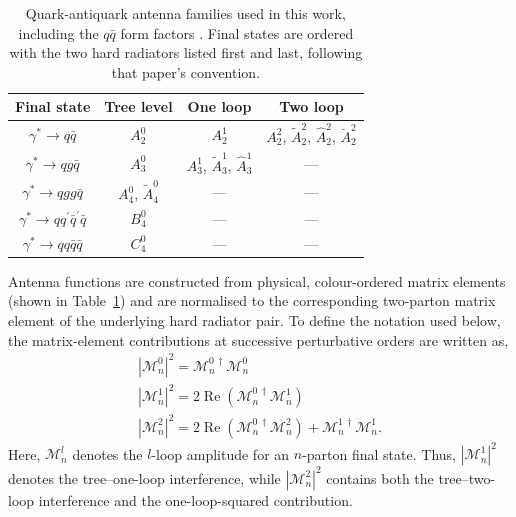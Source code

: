 \begin{table}[h]
\footnotesize
    \centering
\caption{\centering Quark-antiquark antenna families used in this work, including 
    the $q\bar q$ form factors \cite{Gehrmann-DeRidder:2005btv}. Final states are 
    ordered with the two hard radiators listed first and last, following that paper's convention.}
    \renewcommand{\arraystretch}{1.3}
    \begin{tabular}{|c|c|c|c|}
        \hline
        \textbf{Final state} & \textbf{Tree level} & \textbf{One loop} & \textbf{Two loop} \\
        \hline
        $\gamma^*\to q\bar q$ & $A_2^0$ & $A_2^1$ & $A_2^2$, $\tilde A_2^2$, $\hat A_2^2$, $\breve A_2^2$ \\
        \hline
        $\gamma^*\to qg\bar q$ & $A_3^0$ & $A_3^1$, $\tilde A_3^1$, $\hat A_3^1$ & --- \\
     \hline
        $\gamma^*\to qgg\bar q$ & $A_4^0$, $\tilde A_4^0$ & --- & --- \\
        \hline
        $\gamma^*\to qq^\prime\bar q^\prime\bar q$ & $B_4^0$ & --- & --- \\
        \hline
        $\gamma^*\to qq\bar q\bar q$ & $C_4^0$ & --- & --- \\
        \hline
    \end{tabular}
    
    \label{tab:antFamilies}
\end{table}

Antenna functions are constructed from physical, colour-ordered matrix elements
(shown in Table~\ref{tab:antFamilies}) and are normalised to the corresponding
two-parton matrix element of the underlying hard radiator pair. To define the
notation used below, the matrix-element contributions at successive
perturbative orders are written as,
\begin{equation}\label{eq:ampOrders}
    \begin{gathered}
        |\mathcal M_n^0|^2 = \mathcal M_n^{0\,\dagger}\mathcal M_n^0\\
        |\mathcal M_n^1|^2 = 2\operatorname{Re}\left(\mathcal M_n^{0\,\dagger}\mathcal M_n^1\right)\\
        |\mathcal M_n^2|^2 = 2\operatorname{Re}\left(\mathcal M_n^{0\,\dagger}\mathcal M_n^2\right)+\mathcal M_n^{1\,\dagger}\mathcal M_n^{1}.
    \end{gathered}
\end{equation}
Here, $\mathcal M_n^l$ denotes the $l$-loop amplitude for an $n$-parton final
state. Thus, $|\mathcal M_n^1|^2$ denotes the tree--one-loop interference,
while $|\mathcal M_n^2|^2$ contains both the tree--two-loop interference and
the one-loop-squared contribution.

